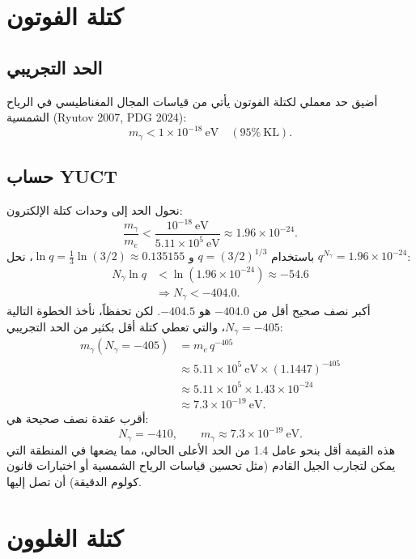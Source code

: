 \documentclass[12pt,a4paper]{article}
\begin{document}
	\section{كتلة الفوتون}
	
	\subsection{الحد التجريبي}
	
	أضيق حد معملي لكتلة الفوتون يأتي من قياسات المجال المغناطيسي في الرياح الشمسية (Ryutov 2007, PDG 2024):
	\begin{equation}\label{eq:photonlimit}
		m_\gamma < 1 \times 10^{-18}~\mathrm{eV} \quad (95\%~\mathrm{KL}).
	\end{equation}
	
	\subsection{حساب YUCT}
	
	نحول الحد إلى وحدات كتلة الإلكترون:
	\[
	\frac{m_\gamma}{m_e} < \frac{10^{-18}~\mathrm{eV}}{5.11\times 10^5~\mathrm{eV}}
	\approx 1.96 \times 10^{-24}.
	\]
	باستخدام $q = (3/2)^{1/3}$ و $\ln q = \tfrac13\ln(3/2) \approx 0.135155$، نحل $q^{N_\gamma} = 1.96\times10^{-24}$:
	\[
	\begin{aligned}
		N_\gamma \ln q &< \ln(1.96\times10^{-24}) \approx -54.6 \\
		&\Longrightarrow N_\gamma < -404.0 .
	\end{aligned}
	\]
	أكبر نصف صحيح أقل من $-404.0$ هو $-404.5$. لكن تحفظاً، نأخذ الخطوة التالية $N_\gamma = -405$، والتي تعطي كتلة أقل بكثير من الحد التجريبي:
	\[
	\begin{aligned}
		m_\gamma(N_\gamma = -405) &= m_e \, q^{-405} \\
		&\approx 5.11\times10^5~\mathrm{eV} \times (1.1447)^{-405} \\
		&\approx 5.11\times10^5 \times 1.43\times10^{-24} \\
		&\approx 7.3 \times 10^{-19}~\mathrm{eV}.
	\end{aligned}
	\]
	أقرب عقدة نصف صحيحة هي:
	\[
	\boxed{N_\gamma = -410}, \qquad
	\boxed{m_\gamma \approx 7.3 \times 10^{-19}~\mathrm{eV}} .
	\]
	هذه القيمة أقل بنحو عامل 1.4 من الحد الأعلى الحالي، مما يضعها في المنطقة التي يمكن لتجارب الجيل القادم (مثل تحسين قياسات الرياح الشمسية أو اختبارات قانون كولوم الدقيقة) أن تصل إليها.
	
	\section{كتلة الغلوون}
	
\end{document}

